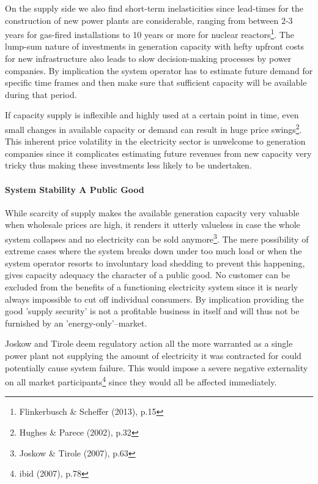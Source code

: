 \documentclass[11pt,a4paper,english]{scrreprt}
\begin{document}
  
On the supply side we also find short-term inelasticities since lead-times for
the construction of new power plants are considerable, ranging from between 2-3
years for gas-fired installations to 10 years or more for nuclear
reactors\footnote{Flinkerbusch \& Scheffer (2013), p.15}. The lump-sum nature of
investments in generation capacity with hefty upfront costs for new
infrastructure also leads to slow decision-making processes by power companies.
By implication the system operator has to estimate future demand for specific
time frames and then make sure that sufficient capacity will be available during
that period.\par
  
  
If capacity supply is inflexible and highly used at a certain point in time,
even small changes in available capacity or demand can result in huge price
swings\footnote{Hughes \& Parece (2002), p.32}. This inherent price volatility
in the electricity sector is unwelcome to generation companies since it
complicates estimating future revenues from new capacity very tricky thus making
these investments less likely to be undertaken.\par


    \paragraph{System Stability \textemdash{} A Public Good}
  
While scarcity of supply makes the available generation capacity very valuable
when wholesale prices are high, it renders it utterly valueless in case the
whole system collapses and no electricity can be sold anymore\footnote{Joskow
\& Tirole (2007), p.63}. The mere possibility of extreme cases where the system
breaks down under too much load or when the system operator resorts to
involuntary load shedding to prevent this happening, gives capacity adequacy the
character of a public good. No customer can be excluded from the benefits of a
functioning electricity system since it is nearly always impossible to cut off
individual consumers. By implication providing the good 'supply security' is not
a profitable business in itself and will thus not be furnished by an
'energy-only'--market.\par
  

Joskow and Tirole deem regulatory action all the more warranted as a single
power plant not supplying the amount of electricity it was contracted for could
potentially cause system failure. This would impose a severe negative
externality on all market participants\footnote{ibid (2007),
p.78} since they would all be affected immediately.\par
  
\end{document}
